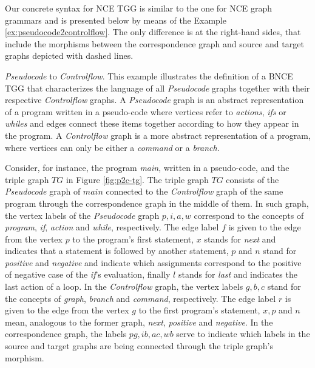 Our concrete syntax for NCE TGG is similar to the one for NCE graph grammars and is presented below by means of the Example \ref{ex:pseudocode2controlflow}. The only difference is at the right-hand sides, that include the morphisms between the correspondence graph and source and target graphs depicted with dashed lines.

\begin{example}{\emph{Pseudocode} to \emph{Controlflow}.}
	\label{ex:pseudocode2controlflow}
	This example illustrates the definition of a BNCE TGG that characterizes the language of all \emph{Pseudocode} graphs together with their respective \emph{Controlflow} graphs. A \emph{Pseudocode} graph is an abstract representation of a program written in a pseudo-code where vertices refer to \emph{actions}, \emph{ifs} or \emph{whiles} and edges connect these items together according to how they appear in the program. A \emph{Controlflow} graph is a more abstract representation of a program, where vertices can only be either a \emph{command} or a \emph{branch}.
	
	Consider, for instance, the program \emph{main}, written in a pseudo-code, and the triple graph $TG$ in Figure \ref{fig:p2c-tg}. The triple graph $TG$ consists of the \emph{Pseudocode} graph of $main$ connected to the \emph{Controlflow} graph of the same program through the correspondence graph in the middle of them. In such graph, the vertex labels of the \emph{Pseudocode} graph $p, i, a, w$ correspond to the concepts of \emph{program}, \emph{if}, \emph{action} and \emph{while}, respectively. The edge label $f$ is given to the edge from the vertex $p$ to the program's first statement, $x$ stands for \emph{next} and indicates that a statement is followed by another statement, $p$ and $n$ stand for \emph{positive} and \emph{negative} and indicate which assignments correspond to the positive of negative case of the \emph{if}'s evaluation, finally $l$ stands for \emph{last} and indicates the last action of a loop. In the \emph{Controlflow} graph, the vertex labels $g, b, c$ stand for the concepts of \emph{graph}, \emph{branch} and \emph{command}, respectively. The edge label $r$ is given to the edge from the vertex $g$ to the first program's statement, $x, p$ and $n$ mean, analogous to the former graph, \emph{next}, \emph{positive} and \emph{negative}. In the correspondence graph, the labels $pg, ib, ac, wb$ serve to indicate which labels in the source and target graphs are being connected through the triple graph's morphism.
	

\end{example}
